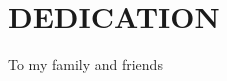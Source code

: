 %
%
%

\chapter*{DEDICATION}
\label{sec:dedication}

\setlength{\leftskip}{4.7cm}


To my family and friends



\setlength{\leftskip}{0pt}

\pagebreak{}

